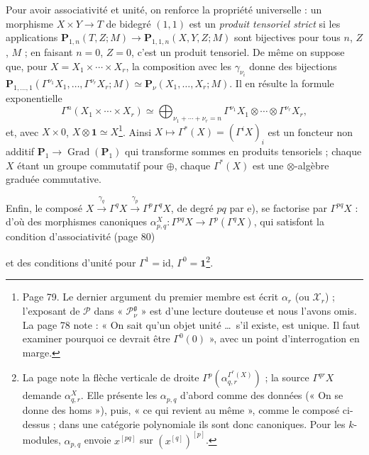 \documentclass[11pt,a4paper]{article}
\begin{document}
Pour avoir associativité et unité, on renforce la propriété universelle : un
morphisme $X \times Y \to T$ de bidegré $(1,1)$ est un \emph{produit
tensoriel strict} si les applications $\mathbf{P}_{1,n}(T, Z; M) \to
\mathbf{P}_{1,1,n}(X, Y, Z; M)$ sont bijectives pour tous $n$, $Z$, $M$ ; en
faisant $n = 0$, $Z = 0$, c'est un produit tensoriel. De même on suppose que,
pour $X = X_{1} \times \cdots \times X_{r}$, la composition avec les
$\gamma_{\nu_{i}}$ donne des bijections
$\mathbf{P}_{1, \ldots, 1}(\Gamma^{\nu_{1}}X_{1}, \ldots,
\Gamma^{\nu_{r}}X_{r}; M) \simeq \mathbf{P}_{\nu}(X_{1}, \ldots, X_{r}; M)$.
Il en résulte la formule exponentielle
\[
  \Gamma^{n}(X_{1} \times \cdots \times X_{r}) \simeq
  \bigoplus_{\nu_{1} + \cdots + \nu_{r} = n} \Gamma^{\nu_{1}}X_{1} \otimes
  \cdots \otimes \Gamma^{\nu_{r}}X_{r},
\]
et, avec $X \times 0$, $X \otimes \mathbf{1} \simeq X$\footnote{Page 79.
Le dernier argument du premier membre est écrit $\alpha_{r}$ (ou
$\mathcal{X}_{r}$) ; l'exposant de $\mathcal{P}$ dans
« $\mathcal{P}^{\mathfrak{g}}_{\nu}$ » est d'une lecture douteuse et nous
l'avons omis. La page 78 note : « On sait qu'un objet unité \ldots\ s'il
existe, est unique. Il faut examiner pourquoi ce devrait être
$\Gamma^{0}(0)$ », avec un point d'interrogation en marge.}. Ainsi
$X \mapsto \Gamma^{*}(X) = (\Gamma^{i}X)_{i}$ est un foncteur non additif
$\mathbf{P}_{1} \to \operatorname{Grad}(\mathbf{P}_{1})$ qui transforme
sommes en produits tensoriels ; chaque $X$ étant un groupe commutatif pour
$\oplus$, chaque $\Gamma^{*}(X)$ est une $\otimes$-algèbre graduée
commutative.

Enfin, le composé $X \xrightarrow{\gamma_{q}} \Gamma^{q}X
\xrightarrow{\gamma_{p}} \Gamma^{p}\Gamma^{q}X$, de degré $pq$ par e), se
factorise par $\Gamma^{pq}X$ : d'où des morphismes canoniques
$\alpha_{p,q}^{X} : \Gamma^{pq}X \to \Gamma^{p}(\Gamma^{q}X)$, qui satisfont
la condition d'associativité (page 80)


et des conditions d'unité pour $\Gamma^{1} = \mathrm{id}$, $\Gamma^{0} =
\mathbf{1}$\footnote{La page note la flèche verticale de droite
$\Gamma^{p}(\alpha^{\Gamma^{r}(X)}_{q,r})$ ; la source $\Gamma^{qr}X$ demande
$\alpha^{X}_{q,r}$. Elle présente les $\alpha_{p,q}$ d'abord comme des
données (« On se donne des homs »), puis, « ce qui revient au même », comme
le composé ci-dessus ; dans une catégorie polynomiale ils sont donc
canoniques. Pour les $k$-modules, $\alpha_{p,q}$ envoie $x^{[pq]}$ sur
$(x^{[q]})^{[p]}$.}.
\end{document}
